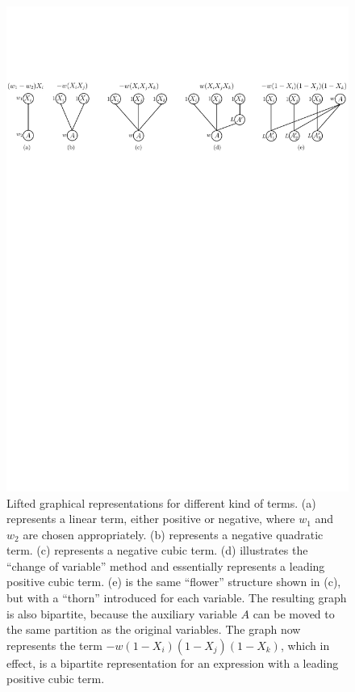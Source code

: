 \begin{figure}[t]
\includegraphics[width=\textwidth]{figs/fig8.pdf}
\caption{Lifted graphical representations for different kind of terms. (a) represents a linear term, either positive or negative, where $w_1$ and $w_2$ are chosen appropriately. (b) represents a negative quadratic term. (c) represents a negative cubic term. (d) illustrates the ``change of variable'' method and essentially represents a leading positive cubic term. (e) is the same ``flower'' structure shown in (c), but with a ``thorn'' introduced for each variable. The resulting graph is also bipartite, because the auxiliary variable $A$ can be moved to the same partition as the original variables. The graph now represents the term $-w (1-X_i)(1-X_j)(1-X_k)$, which in effect, is a bipartite representation for an expression with a leading positive cubic term.}
\label{fig_lifted_rep}
\end{figure}
